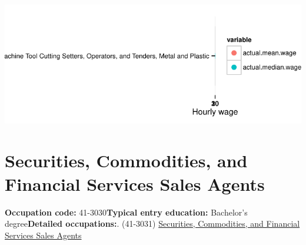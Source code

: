 \documentclass[a4paper,10pt]{article}\usepackage[]{graphicx}\usepackage[]{color}
\makeatletter
\def\maxwidth{ %
  \ifdim\Gin@nat@width>\linewidth
    \linewidth
  \else
    \Gin@nat@width
  \fi
}
\makeatother
\begin{document}
{\centering \includegraphics[width=\maxwidth]{figure/unnamed-chunk-298} 

}


\newpage\section{Securities, Commodities, and Financial Services Sales Agents}\textbf{Occupation code:} 41-3030\newline\textbf{Typical entry education:} Bachelor's degree\newline\textbf{Detailed occupations:}. (41-3031)  \href{http://www.bls.gov/oes/current/oes413031.htm}{Securities, Commodities, and Financial Services Sales Agents}\newline%
\end{document}
